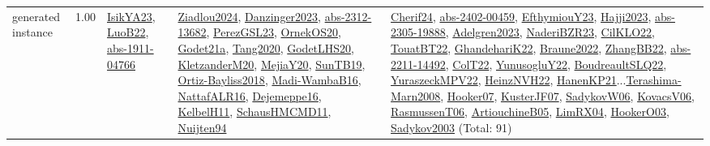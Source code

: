 {\begin{longtable}{p{3cm}r>{\raggedright\arraybackslash}p{6cm}>{\raggedright\arraybackslash}p{6cm}>{\raggedright\arraybackslash}p{8cm}}
\index{generated instance}\index{Benchmarks!generated instance}generated instance &  1.00 & \hyperref[detail:IsikYA23]{IsikYA23}, \hyperref[detail:LuoB22]{LuoB22}, \hyperref[detail:abs-1911-04766]{abs-1911-04766} & \hyperref[detail:Ziadlou2024]{Ziadlou2024}, \hyperref[detail:Danzinger2023]{Danzinger2023}, \hyperref[detail:abs-2312-13682]{abs-2312-13682}, \hyperref[detail:PerezGSL23]{PerezGSL23}, \hyperref[detail:OrnekOS20]{OrnekOS20}, \hyperref[detail:Godet21a]{Godet21a}, \hyperref[detail:Tang2020]{Tang2020}, \hyperref[detail:GodetLHS20]{GodetLHS20}, \hyperref[detail:KletzanderM20]{KletzanderM20}, \hyperref[detail:MejiaY20]{MejiaY20}, \hyperref[detail:SunTB19]{SunTB19}, \hyperref[detail:Ortiz-Bayliss2018]{Ortiz-Bayliss2018}, \hyperref[detail:Madi-WambaB16]{Madi-WambaB16}, \hyperref[detail:NattafALR16]{NattafALR16}, \hyperref[detail:Dejemeppe16]{Dejemeppe16}, \hyperref[detail:KelbelH11]{KelbelH11}, \hyperref[detail:SchausHMCMD11]{SchausHMCMD11}, \hyperref[detail:Nuijten94]{Nuijten94} & \hyperref[detail:Cherif24]{Cherif24}, \hyperref[detail:abs-2402-00459]{abs-2402-00459}, \hyperref[detail:EfthymiouY23]{EfthymiouY23}, \hyperref[detail:Hajji2023]{Hajji2023}, \hyperref[detail:abs-2305-19888]{abs-2305-19888}, \hyperref[detail:Adelgren2023]{Adelgren2023}, \hyperref[detail:NaderiBZR23]{NaderiBZR23}, \hyperref[detail:CilKLO22]{CilKLO22}, \hyperref[detail:TouatBT22]{TouatBT22}, \hyperref[detail:GhandehariK22]{GhandehariK22}, \hyperref[detail:Braune2022]{Braune2022}, \hyperref[detail:ZhangBB22]{ZhangBB22}, \hyperref[detail:abs-2211-14492]{abs-2211-14492}, \hyperref[detail:ColT22]{ColT22}, \hyperref[detail:YunusogluY22]{YunusogluY22}, \hyperref[detail:BoudreaultSLQ22]{BoudreaultSLQ22}, \hyperref[detail:YuraszeckMPV22]{YuraszeckMPV22}, \hyperref[detail:HeinzNVH22]{HeinzNVH22}, \hyperref[detail:HanenKP21]{HanenKP21}...\hyperref[detail:Terashima-Marn2008]{Terashima-Marn2008}, \hyperref[detail:Hooker07]{Hooker07}, \hyperref[detail:KusterJF07]{KusterJF07}, \hyperref[detail:SadykovW06]{SadykovW06}, \hyperref[detail:KovacsV06]{KovacsV06}, \hyperref[detail:RasmussenT06]{RasmussenT06}, \hyperref[detail:ArtiouchineB05]{ArtiouchineB05}, \hyperref[detail:LimRX04]{LimRX04}, \hyperref[detail:HookerO03]{HookerO03}, \hyperref[detail:Sadykov2003]{Sadykov2003} (Total: 91)\\

\end{longtable}}
